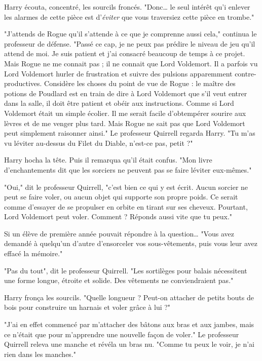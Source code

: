 Harry écouta, concentré, les sourcils froncés. "Donc… le seul intérêt qu'i enlever les alarmes de cette pièce est d'\emph{éviter}  que vous traversiez cette pièce en trombe."

"J'attends de Rogue qu'il s'attende à ce que je comprenne aussi cela," continua le professeur de défense. "Passé ce cap, je ne peux pas prédire le niveau de jeu qu'il attend de moi. Je suis patient et j'ai consacré beaucoup de temps à ce projet. Mais Rogue ne me connait pas ; il ne connait que Lord Voldemort. Il a parfois vu Lord Voldemort hurler de frustration et suivre des pulsions apparemment contre-productives. Considère les choses du point de vue de Rogue : le maître des potions de Poudlard est en train de dire à Lord Voldemort que s'il veut entrer dans la salle, il doit être patient et obéir aux instructions. Comme si Lord Voldemort était un simple écolier. Il me serait facile d'obtempérer sourire aux lèvres et de me venger plus tard. Mais Rogue ne sait pas que Lord Voldemort peut simplement raisonner ainsi." Le professeur Quirrell regarda Harry. "Tu m'as vu léviter au-dessus du Filet du Diable, n'est-ce pas, petit ?"

Harry hocha la tête. Puis il remarqua qu'il était confus. "Mon livre d'enchantements dit que les sorciers ne peuvent pas se faire léviter eux-mêmes."

"Oui," dit le professeur Quirrell, "c'est bien ce qui y est écrit. Aucun sorcier ne peut se faire voler, ou aucun objet qui supporte son propre poids. Ce serait comme d'essayer de se propulser en orbite en tirant sur ses cheveux. Pourtant, Lord Voldemort peut voler. Comment ? Réponds aussi vite que tu peux."

Si un élève de première année pouvait répondre à la question… "Vous avez demandé à quelqu'un d'autre d'ensorceler vos sous-vêtements, puis vous leur avez effacé la mémoire."

"Pas du tout", dit le professeur Quirrell. "Les sortilèges pour balais nécessitent une forme longue, étroite et solide. Des vêtements ne conviendraient pas."

Harry fronça les sourcils. "Quelle longueur ? Peut-on attacher de petits bouts de bois pour construire un harnais et voler grâce à lui ?"

"J'ai en effet commencé par m'attacher des bâtons aux bras et aux jambes, mais ce n'était que pour m'apprendre une nouvelle façon de voler." Le professeur Quirrell releva une manche et révéla un bras nu. "Comme tu peux le voir, je n'ai rien dans les manches."

